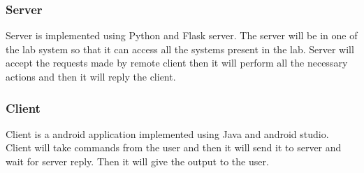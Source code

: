 \documentclass[oneside,a4paper,12pt]{article}
\begin{document}
\subsubsection{Server}
Server is implemented using Python and Flask server. The server will be in one of the lab system so that it can access all the systems present in the lab. Server will accept the requests made by remote client then it will perform all the necessary actions and then it will reply the client.
\subsubsection{Client}
Client is a android application implemented using Java and android studio. Client will take commands from the user and then it will send it to server and wait for server reply. Then it will give the output to the user.
\newpage
\end{document}
